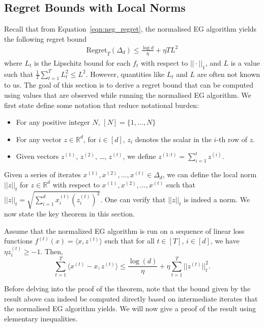 \subsection{Regret Bounds with Local Norms}
Recall that from Equation~\ref{eqn:neg_regret}, the normalised EG algorithm yields the following regret bound
\begin{align*}
\text{Regret}_T(\Delta_d) \leq \frac{\log d}{\eta} + \eta TL^2
\end{align*}
where $L_t$ is the Lipschitz bound for each $f_t$ with respect to $||\cdot||_1$, and $L$ is a value such that $\frac{1}{T}\sum_{t=1}^T L_t^2 \leq L^2$. However, quantities like $L_t$ and $L$ are often not known to us. The goal of this section is to derive a regret bound that can be computed using values that are observed while running the normalised EG algorithm. We first state define some notation that reduce notational burden:
\begin{itemize}
    \item For any positive integer $N$, $[N] = \{1, \dots, N\}$
    \item For any vector $z \in \mathbb{R}^d$, for $i \in [d]$, $z_i$ denotes the scalar in the $i$-th row of $z$. 
    \item Given vectors $z^{(1)}$, $z^{(2)}$, \dots, $z^{(t)}$, we define $z^{(1:t)} = \sum_{i=1}^t z^{(i)}$.
\end{itemize}
Given a series of iterates $x^{(1)}, x^{(2)}, \dots, x^{(t)} \in \Delta_d$, we can define the local norm $||z||_t$ for $z \in \mathbb{R}^d$ with respect to $x^{(1)}, x^{(2)}, \dots, x^{(t)}$ such that $||z||_t = \sqrt{\sum_{i=1}^d x^{(t)}_i (z^{(t)}_i)^2}$. One can verify that $||z||_t$ is indeed a norm. We now state the key theorem in this section.
\begin{theorem}\label{thm:EG_local_norm_regret_bound}
    Assume that the normalized EG algorithm is run on a sequence of linear loss functions $f^{(t)}(x) = \langle x, z^{(t)} \rangle$ such that for all $t \in [T]$, $i \in [d]$, we have $\eta z^{(t)}_i \geq -1$. Then,
    $$
    \sum_{t=1}^T \langle x^{(t)} - x, z^{(t)} \rangle
    \leq \frac{\log(d)}{\eta} + \eta \sum_{t=1}^T ||z^{(t)}||^2_t.
    $$
\end{theorem}
\noindent Before delving into the proof of the theorem, note that the bound given by the result above can indeed be computed directly based on intermediate iterates that the normalised EG algorithm yields.  We will now give a proof of the result using elementary inequalities.\\
